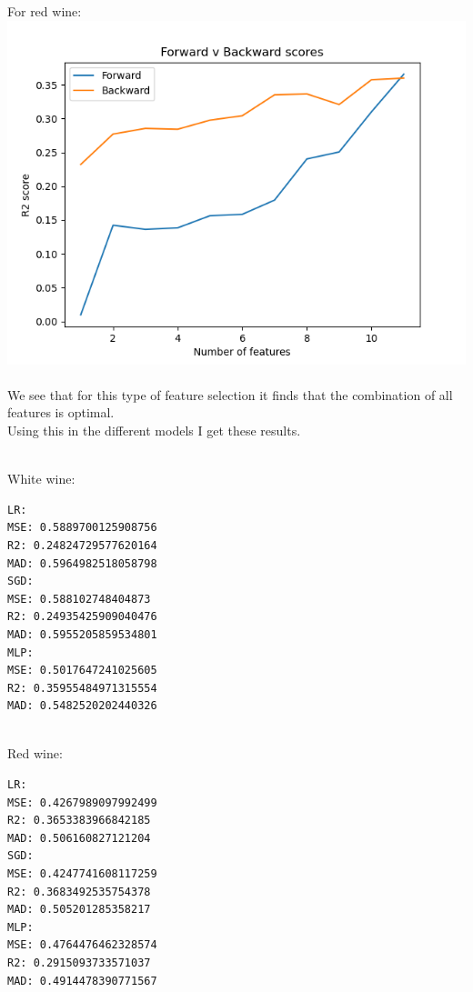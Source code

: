 \documentclass[12pt, letterpaper, twoside]{article}
\begin{document}
For red wine:\\
\includegraphics[scale=0.75]{"forward_v_backward_red"}\\
\ \\
We see that for this type of feature selection it finds that the combination of all features is optimal.\\
Using this in the different models I get these results.\\
\ \\
\begin{multicols}{2}
White wine:\\
\begin{verbatim}
LR:
MSE: 0.5889700125908756
R2: 0.24824729577620164
MAD: 0.5964982518058798
SGD:
MSE: 0.588102748404873
R2: 0.24935425909040476
MAD: 0.5955205859534801
MLP:
MSE: 0.5017647241025605
R2: 0.35955484971315554
MAD: 0.5482520202440326
\end{verbatim}
\ \\
Red wine:
\begin{verbatim}
LR:
MSE: 0.4267989097992499
R2: 0.3653383966842185
MAD: 0.506160827121204
SGD:
MSE: 0.4247741608117259
R2: 0.3683492535754378
MAD: 0.505201285358217
MLP:
MSE: 0.4764476462328574
R2: 0.2915093733571037
MAD: 0.4914478390771567
\end{verbatim}
\end{multicols}
\end{document}
